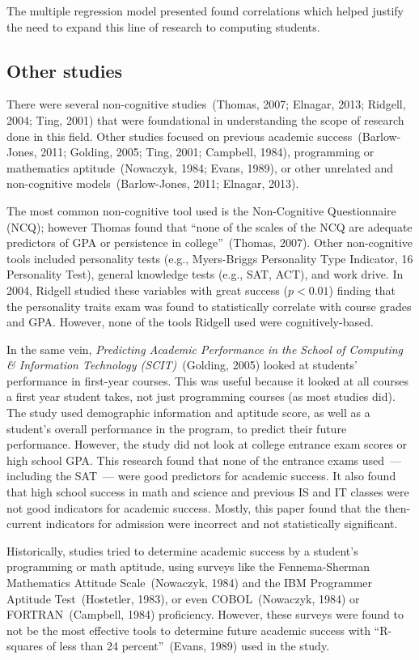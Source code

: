 The multiple regression model presented found correlations which helped justify the need to expand this line of research to computing students.

\subsection{Other studies}
There were several non-cognitive studies~(Thomas, 2007; Elnagar, 2013; Ridgell, 2004; Ting, 2001) that were foundational in understanding the scope of research done in this field. Other studies focused on previous academic success~(Barlow-Jones, 2011; Golding, 2005; Ting, 2001; Campbell, 1984), programming or mathematics aptitude~(Nowaczyk, 1984; Evans, 1989), or other unrelated and non-cognitive models~(Barlow-Jones, 2011; Elnagar, 2013).

The most common non-cognitive tool used is the Non-Cognitive Questionnaire (NCQ); however Thomas found that ``none of the scales of the NCQ are adequate predictors of GPA or persistence in college''~(Thomas, 2007). Other non-cognitive tools included personality tests (e.g., Myers-Briggs Personality Type Indicator, 16 Personality Test), general knowledge tests (e.g., SAT, ACT), and work drive. In 2004, Ridgell studied these variables with great success ($p<0.01$) finding that the personality traits exam was found to statistically correlate with course grades and GPA. However, none of the tools Ridgell used were cognitively-based.

In the same vein, \textit{Predicting Academic Performance in the School of Computing \& Information Technology (SCIT)}~(Golding, 2005) looked at students' performance in first-year courses. This was useful because it looked at all courses a first year student takes, not just programming courses (as most studies did). The study used demographic information and aptitude score, as well as a student's overall performance in the program, to predict their future performance. However, the study did not look at college entrance exam scores or high school GPA. This research found that none of the entrance exams used~--- including the SAT~--- were good predictors for academic success. It also found that high school success in math and science and previous IS and IT classes were not good indicators for academic success. Mostly, this paper found that the then-current indicators for admission were incorrect and not statistically significant.

Historically, studies tried to determine academic success by a student's programming or math aptitude, using surveys like the Fennema-Sherman Mathematics Attitude Scale~(Nowaczyk, 1984) and the IBM Programmer Aptitude Test~(Hostetler, 1983), or even COBOL~(Nowaczyk, 1984) or FORTRAN~(Campbell, 1984) proficiency. However, these surveys were found to not be the most effective tools to determine future academic success with ``R-squares of less than 24 percent''~(Evans, 1989) used in the study.

